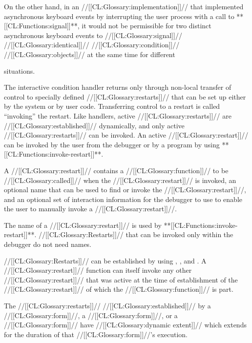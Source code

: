 On the other hand, in an //[[CL:Glossary:implementation]]// that implemented asynchronous  keyboard events by interrupting the user process with a call to **[[CL:Functions:signal]]**, it would not be permissible for two distinct asynchronous keyboard events to //[[CL:Glossary:signal]]// //[[CL:Glossary:identical]]// //[[CL:Glossary:condition]]// //[[CL:Glossary:objects]]// at the same time for different 

situations.

  \endsubsubsubsection%

\endsubsubsection%
 

The interactive condition handler returns only through non-local transfer of control to specially defined //[[CL:Glossary:restarts]]// that can be set up either by the system or by user code.  Transferring control to a restart is called ``invoking'' the restart.  Like handlers, active //[[CL:Glossary:restarts]]// are //[[CL:Glossary:established]]// dynamically, and  only active //[[CL:Glossary:restarts]]// can be invoked.  An active  //[[CL:Glossary:restart]]// can be invoked by the user from the debugger or by a program by using **[[CL:Functions:invoke-restart]]**.
 

A //[[CL:Glossary:restart]]// contains a  //[[CL:Glossary:function]]// to be //[[CL:Glossary:called]]// when the //[[CL:Glossary:restart]]// is invoked, an optional name that can be used to find or invoke the  //[[CL:Glossary:restart]]//, and an optional set of interaction information for the debugger to use to enable the user to manually invoke a //[[CL:Glossary:restart]]//. 

The name of a //[[CL:Glossary:restart]]// is used by **[[CL:Functions:invoke-restart]]**. //[[CL:Glossary:Restarts]]// that can be invoked only within the debugger do not need names.

  //[[CL:Glossary:Restarts]]// can be established by using ,  , and . A //[[CL:Glossary:restart]]// function can itself invoke any other //[[CL:Glossary:restart]]// that was active at the time of establishment of the //[[CL:Glossary:restart]]//  of which the //[[CL:Glossary:function]]// is part.

  The //[[CL:Glossary:restarts]]// //[[CL:Glossary:established]]// by 
    a  //[[CL:Glossary:form]]//, 
    a  //[[CL:Glossary:form]]//,
 or a  //[[CL:Glossary:form]]// have //[[CL:Glossary:dynamic extent]]// which extends for the duration of that //[[CL:Glossary:form]]//'s execution.

